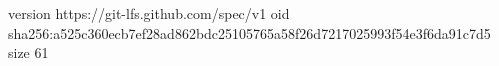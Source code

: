 version https://git-lfs.github.com/spec/v1
oid sha256:a525c360ecb7ef28ad862bdc25105765a58f26d7217025993f54e3f6da91c7d5
size 61
